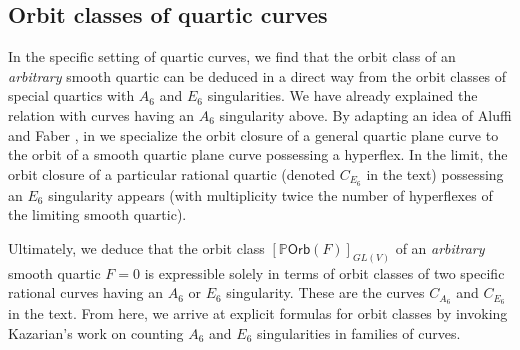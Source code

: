 \documentclass[12 pt, reqno]{amsart}
\newtheorem{thm}{Theorem}[section]
\theoremstyle{definition}
\newcommand{\mb}{\mathbb}
\renewcommand{\P}{\mb{P}}
\newcommand{\Orb}{\mathsf{Orb}}
\begin{document}

\subsection{Orbit classes of quartic curves}
\label{sec:quartic}


In the specific setting of quartic curves, we find that the orbit
class of an {\sl arbitrary} smooth quartic can be deduced in a direct
way from the orbit classes of special quartics with $A_6$ and $E_6$
singularities.  We have already explained the relation with curves
having an $A_6$ singularity above.  By adapting an idea of Aluffi and
Faber \cite[Theorem IV(2)]{AF93P}, in  we
specialize the orbit closure of a general quartic plane curve to the
orbit of a smooth quartic plane curve possessing a hyperflex. In the
limit, the orbit closure of a particular rational quartic (denoted
$C_{E_{6}}$ in the text) possessing an $E_6$ singularity appears (with
multiplicity twice the number of hyperflexes of the limiting smooth
quartic).

Ultimately, we deduce that the orbit class $[\P \Orb({F})]_{GL(V)}$ of
an {\sl arbitrary} smooth quartic $F=0$ is expressible solely in terms
of orbit classes of two specific rational curves having an $A_6$ or
$E_6$ singularity.  These are the curves $C_{A_{6}}$ and $C_{E_{6}}$
in the text. From here, we arrive at explicit formulas for orbit
classes by invoking Kazarian's work \cite{Kazarian} on counting $A_6$
and $E_6$ singularities in families of curves.
\end{document}
